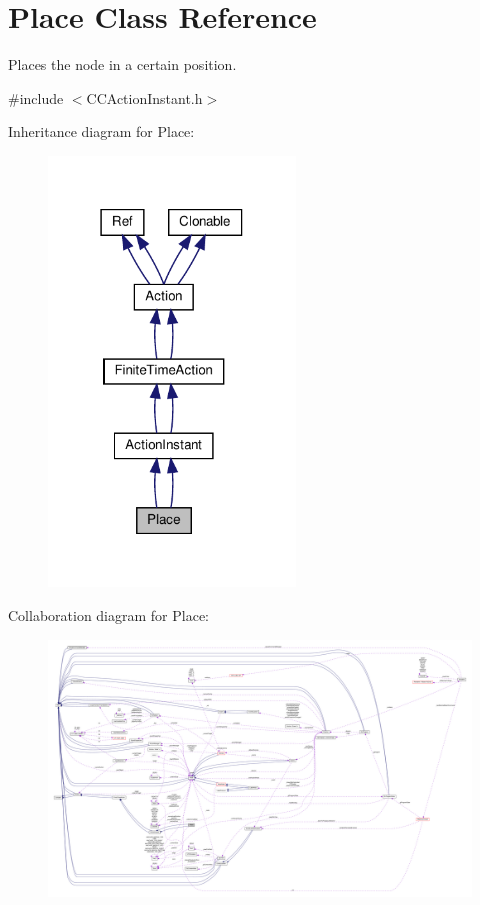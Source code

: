 \hypertarget{classPlace}{}\section{Place Class Reference}
\label{classPlace}


Places the node in a certain position.  




{\ttfamily \#include $<$C\+C\+Action\+Instant.\+h$>$}



Inheritance diagram for Place\+:
\nopagebreak
\begin{figure}[H]
\begin{center}
\leavevmode
\includegraphics[width=186pt]{classPlace__inherit__graph}
\end{center}
\end{figure}


Collaboration diagram for Place\+:
\nopagebreak
\begin{figure}[H]
\begin{center}
\leavevmode
\includegraphics[width=350pt]{classPlace__coll__graph}
\end{center}
\end{figure}
